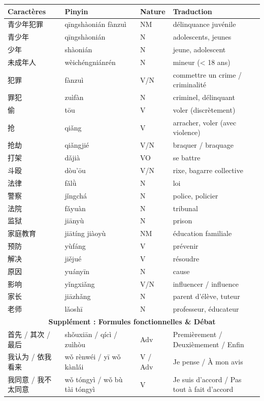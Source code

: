 \documentclass[11pt]{article}
\begin{document}
\begin{center}
\begin{tabularx}{\linewidth}{|X|X|X|X|}
\hline
\rowcolor{popblueL} Caractères & Pinyin & Nature & Traduction \\
\hline
青少年犯罪 & qīngshàonián fànzuì & NM & délinquance juvénile \\
青少年 & qīngshàonián & N & adolescents, jeunes \\
少年 & shàonián & N & jeune, adolescent \\
未成年人 & wèichéngniánrén & N & mineur (< 18 ans) \\
犯罪 & fànzuì & V/N & commettre un crime / criminalité \\
罪犯 & zuìfàn & N & criminel, délinquant \\
偷 & tōu & V & voler (discrètement) \\
抢 & qiǎng & V & arracher, voler (avec violence) \\
抢劫 & qiǎngjié & V/N & braquer / braquage \\
打架 & dǎjià & VO & se battre \\
斗殴 & dòu'ōu & V/N & rixe, bagarre collective \\
法律 & fǎlǜ & N & loi \\
警察 & jǐngchá & N & police, policier \\
法院 & fǎyuàn & N & tribunal \\
监狱 & jiānyù & N & prison \\
家庭教育 & jiātíng jiàoyù & NM & éducation familiale \\
预防 & yùfáng & V & prévenir \\
解决 & jiějué & V & résoudre \\
原因 & yuányīn & N & cause \\
影响 & yǐngxiǎng & V/N & influencer / influence \\
家长 & jiāzhǎng & N & parent d'élève, tuteur \\
老师 & lǎoshī & N & professeur, éducateur \\
\hline
\multicolumn{4}{|c|}{\textbf{Supplément : Formules fonctionnelles \& Débat}} \\
\hline
首先 / 其次 / 最后 & shǒuxiān / qícì / zuìhòu & Adv & Premièrement / Deuxièmement / Enfin \\
我认为 / 依我看来 & wǒ rènwéi / yī wǒ kànlái & V / Adv & Je pense / À mon avis \\
我同意 / 我不太同意 & wǒ tóngyì / wǒ bù tài tóngyì & V & Je suis d'accord / Pas tout à fait d'accord \\

\end{tabularx}
\end{center}
\end{document}
